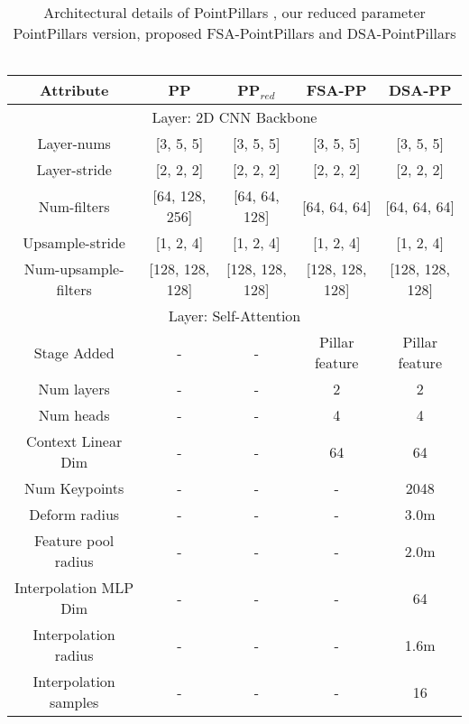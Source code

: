 \documentclass[10pt,twocolumn,letterpaper]{article}
\begin{document}
\begin{table*}[t]
    \centering
    \begin{tabular*}{\textwidth}{|c||c|c|c|c|}
        \hline
        Attribute & PP \cite{pointpillars} & PP$_{red}$ & FSA-PP & DSA-PP \\
        \hline
        \hline
         \multicolumn{5}{|c|}{Layer: 2D CNN Backbone}  \\
        \hline
         Layer-nums & [3, 5, 5] & [3, 5, 5] & [3, 5, 5] & [3, 5, 5]\\
         \hline
         Layer-stride & [2, 2, 2] & [2, 2, 2] & [2, 2, 2] & [2, 2, 2] \\
         \hline
         Num-filters & [64, 128, 256] & [64, 64, 128] & [64, 64, 64] & [64, 64, 64] \\
         \hline
         Upsample-stride & [1, 2, 4] & [1, 2, 4] & [1, 2, 4] & [1, 2, 4] \\
         \hline
         Num-upsample-filters & [128, 128, 128] & [128, 128, 128] & [128, 128, 128] & [128, 128, 128] \\
         \hline
         \hline
        \multicolumn{5}{|c|}{Layer: Self-Attention}  \\
        \hline
        \hline
         Stage Added & - & - & Pillar feature & Pillar feature \\
         \hline
          Num layers & - & - & 2 & 2 \\
         \hline
          Num heads & - & - & 4 & 4 \\
         \hline
         Context Linear Dim & - & - & 64 & 64 \\
         \hline
         Num Keypoints & - & - & - & 2048 \\
         \hline
         Deform radius & - & - & - & 3.0m \\
         \hline
         Feature pool radius & - & - & - & 2.0m \\
         \hline
         Interpolation MLP Dim & - & - & - & 64 \\
         \hline
         Interpolation radius & - & - & - & 1.6m \\
         \hline
         Interpolation samples & - & - & - & 16 \\
         \hline
         
    \end{tabular*}
    \caption{Architectural details of PointPillars \cite{pointpillars}, our reduced parameter PointPillars version, proposed FSA-PointPillars and DSA-PointPillars \\ \\}
    \label{tab:pointpillar_archi}
\end{table*} \setlength{\tabcolsep}{13.8pt}
\end{document}
